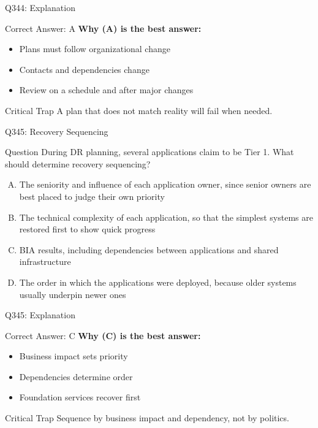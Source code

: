 \documentclass{beamer}
\begin{document}
	\begin{frame}{Q344: Explanation}
		\begin{block}{Correct Answer: A}
			\textbf{Why (A) is the best answer:}
			\begin{itemize}
				\item Plans must follow organizational change
				\item Contacts and dependencies change
				\item Review on a schedule and after major changes
			\end{itemize}
		\end{block}
		\begin{alertblock}{Critical Trap}
			A plan that does not match reality will fail when needed.
		\end{alertblock}
	\end{frame}
	
	\begin{frame}{Q345: Recovery Sequencing}
		\begin{block}{Question}
			\small During DR planning, several applications claim to be Tier 1. What should determine recovery sequencing?
		\end{block}
		\begin{enumerate}[(A)]
			\footnotesize
			\item The seniority and influence of each application owner, since senior owners are best placed to judge their own priority
			\item The technical complexity of each application, so that the simplest systems are restored first to show quick progress
			\item BIA results, including dependencies between applications and shared infrastructure
			\item The order in which the applications were deployed, because older systems usually underpin newer ones
		\end{enumerate}
	\end{frame}
	
	\begin{frame}{Q345: Explanation}
		\begin{block}{Correct Answer: C}
			\textbf{Why (C) is the best answer:}
			\begin{itemize}
				\item Business impact sets priority
				\item Dependencies determine order
				\item Foundation services recover first
			\end{itemize}
		\end{block}
		\begin{alertblock}{Critical Trap}
			Sequence by business impact and dependency, not by politics.
		\end{alertblock}
	\end{frame}
	
\end{document}
